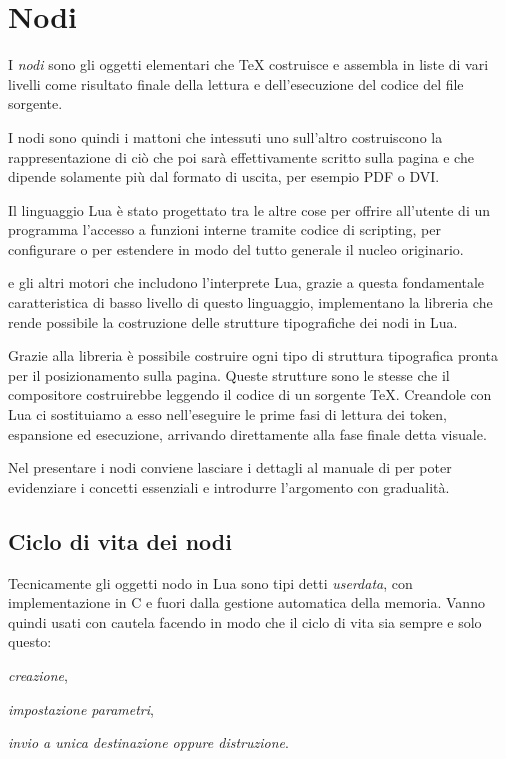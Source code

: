 

\chapter{Nodi}
\label{iiiChNodi}

I \emph{nodi} sono gli oggetti elementari che \TeX{} costruisce e assembla in
liste di vari livelli come risultato finale della lettura e dell'esecuzione del
codice del file sorgente.

I nodi sono quindi i mattoni che intessuti uno sull'altro costruiscono la
rappresentazione di ciò che poi sarà effettivamente scritto sulla pagina e che
dipende solamente più dal formato di uscita, per esempio PDF o DVI.

Il linguaggio Lua è stato progettato tra le altre cose per offrire all'utente di
un programma l'accesso a funzioni interne tramite codice di scripting, per
configurare o per estendere in modo del tutto generale il nucleo originario.

\LuaTeX{} e gli altri motori che includono l'interprete Lua, grazie a questa
fondamentale caratteristica di basso livello di questo linguaggio, implementano
la libreria  che rende possibile la costruzione delle strutture
tipografiche dei nodi in Lua.

Grazie alla libreria  è possibile costruire ogni tipo di struttura
tipografica pronta per il posizionamento sulla pagina. Queste strutture sono le
stesse che il compositore costruirebbe leggendo il codice di un sorgente \TeX{}.
Creandole con Lua ci sostituiamo a esso nell'eseguire le prime fasi di lettura
dei token, espansione ed esecuzione, arrivando direttamente alla fase finale
detta visuale.

Nel presentare i nodi conviene lasciare i dettagli al manuale di \LuaTeX{}
\cite{prg:luatex} per poter evidenziare i concetti essenziali e introdurre
l'argomento con gradualità.


\section{Ciclo di vita dei nodi}
\label{iiiSecCicloVitaNodi}

Tecnicamente gli oggetti nodo in Lua sono tipi detti \emph{userdata}, con
implementazione in C e fuori dalla gestione automatica della memoria. Vanno
quindi usati con cautela facendo in modo che il ciclo di vita sia sempre e solo
questo:
\begin{compactenumerate}
\item \emph{creazione}, 
\item \emph{impostazione parametri},
\item \emph{invio a unica destinazione oppure distruzione}.
\end{compactenumerate}

